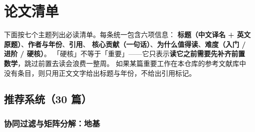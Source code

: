 \section{论文清单}

下面按七个主题列出必读清单。每条统一包含六项信息：
\textbf{标题（中文译名 + 英文原题）}、\textbf{作者与年份}、\textbf{引用}、
\textbf{核心贡献（一句话）}、\textbf{为什么值得读}、\textbf{难度（入门 / 进阶 / 硬核）}。
「硬核」不等于「重要」——它只表示\textbf{读它之前需要先补齐前置数学}，跳过前置去读会浪费一整周。
如果某篇重要工作在本仓库的参考文献库中没有条目，则只用正文文字给出标题与年份，不给出引用标记。

\subsection{推荐系统（30 篇）}

\subsubsection{协同过滤与矩阵分解：地基}

